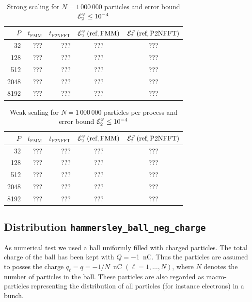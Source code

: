 \begin{table}[p]
  \centering
  \begin{tabular}{|r||r|r||c|c|}
    \hline
    $P$ & $t_\textrm{FMM}$ & $t_\textrm{P2NFFT}$ &
    \rule{0cm}{3ex}
    ${\cal E}^{\varphi}_2\left(\textrm{ref},\textrm{FMM}\right)$ &
    ${\cal E}^{\varphi}_2\left(\textrm{ref},\textrm{P2NFFT}\right)$ \\
    \hline
    32   & ??? & ??? & ??? & ??? \\
    128  & ??? & ??? & ??? & ??? \\
    512  & ??? & ??? & ??? & ??? \\
    2048 & ??? & ??? & ??? & ??? \\
    8192 & ??? & ??? & ??? & ??? \\
    \hline
  \end{tabular}
  \caption{Strong scaling for $N=1\,000\,000$ particles and error bound ${\cal E}^{\varphi}_2 \le 10^{-4}$}
\end{table}

\begin{table}[p]
  \centering
  \begin{tabular}{|r||r|r||c|c|}
    \hline
    $P$ & $t_\textrm{FMM}$ & $t_\textrm{P2NFFT}$ &
    \rule{0cm}{3ex}
    ${\cal E}^{\varphi}_2\left(\textrm{ref},\textrm{FMM}\right)$ &
    ${\cal E}^{\varphi}_2\left(\textrm{ref},\textrm{P2NFFT}\right)$ \\
    \hline
    32   & ??? & ??? & ??? & ??? \\
    128  & ??? & ??? & ??? & ??? \\
    512  & ??? & ??? & ??? & ??? \\
    2048 & ??? & ??? & ??? & ??? \\
    8192 & ??? & ??? & ??? & ??? \\
    \hline
  \end{tabular}
  \caption{Weak scaling for $N=1\,000\,000$ particles per process and error bound ${\cal E}^{\varphi}_2 \le 10^{-4}$}
\end{table}

\subsection{Distribution \texttt{hammersley\_{}ball\_{}neg\_{}charge}}

As numerical test we used a ball uniformly filled with charged particles. The
total charge of the ball has been kept with $Q=-$1~nC. Thus the particles are assumed to
posses the charge $q_\ell=q=-1/N$~nC $(\ell=1,\dots,N)$, where $N$ denotes the number of
particles in the ball. These particles are also regarded as macro-particles representing
the distribution of all particles (for instance electrons) in a bunch. 

